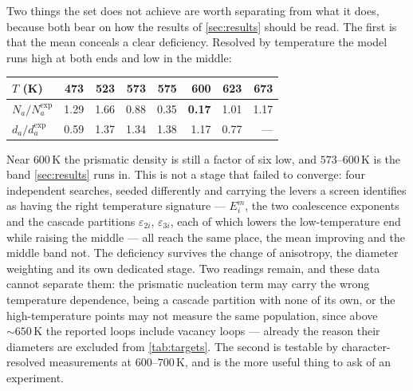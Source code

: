 \label{sec:atrend}\label{sec:bias-caveat}
Two things the set does not achieve are worth separating from what it does,
because both bear on how the results of \cref{sec:results} should be read. The
first is that the \aloop{} mean conceals a clear deficiency. Resolved by temperature the
model runs high at both ends and low in the middle:

\begin{center}
\begin{tabular}{@{}lrrrrrrr@{}}
\toprule
$T$ (K) & 473 & 523 & 573 & 575 & 600 & 623 & 673 \\
\midrule
$N_a/N_a^{\exp}$ & 1.29 & 1.66 & 0.88 & 0.35 & \textbf{0.17} & 1.01 & 1.17 \\
$d_a/d_a^{\exp}$ & 0.59 & 1.37 & 1.34 & 1.38 & 1.17 & 0.77 & --- \\
\bottomrule
\end{tabular}
\end{center}

Near $600\,$K the prismatic density is still a factor of six low, and
$573$--$600\,$K is the band \cref{sec:results} runs in. This is not a stage that
failed to converge: four independent searches, seeded differently and carrying
the levers a screen identifies as having the right temperature signature ---
$E^{m}_{i}$, the two coalescence exponents and the cascade partitions
$\varepsilon_{2i}$, $\varepsilon_{3i}$, each of which lowers the low-temperature
end while raising the middle --- all reach the same place, the mean improving
and the middle band not. The deficiency survives the change of anisotropy, the
diameter weighting and its own dedicated stage. Two readings remain, and these
data cannot separate them: the prismatic nucleation term may carry the wrong
temperature dependence, being a cascade partition with none of its own, or the
high-temperature points may not measure the same population, since above
$\sim\!650\,$K the reported \aloop{} loops include vacancy loops --- already the
reason their diameters are excluded from \cref{tab:targets}. The second is
testable by character-resolved measurements at $600$--$700\,$K, and is the more
useful thing to ask of an experiment.

